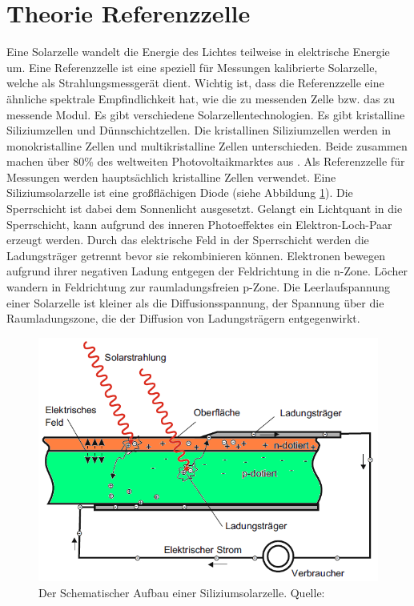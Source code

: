 \documentclass[a4paper,bibtotoc,oneside]{scrbook}
\begin{document}
\section{Theorie Referenzzelle}\thispagestyle{empty}
Eine Solarzelle wandelt die Energie des Lichtes teilweise in elektrische Energie um. Eine Referenzzelle ist eine speziell für Messungen kalibrierte Solarzelle, welche als Strahlungsmessgerät dient. Wichtig ist, dass die Referenzzelle eine ähnliche spektrale Empfindlichkeit hat, wie die zu messenden Zelle bzw. das zu messende Modul.
Es gibt verschiedene Solarzellentechnologien. Es gibt kristalline Siliziumzellen und Dünnschichtzellen. Die kristallinen Siliziumzellen werden in monokristalline Zellen und multikristalline Zellen unterschieden. Beide zusammen machen über 80\% des weltweiten Photovoltaikmarktes aus \cite{iea00}. Als Referenzzelle für Messungen werden hauptsächlich kristalline Zellen verwendet. 
Eine Siliziumsolarzelle ist eine großflächigen Diode (siehe Abbildung \ref{cell}). Die Sperrschicht ist dabei dem Sonnenlicht ausgesetzt. Gelangt ein Lichtquant in die Sperrschicht, kann aufgrund des inneren Photoeffektes ein Elektron-Loch-Paar erzeugt werden. Durch das elektrische Feld in der Sperrschicht werden die Ladungsträger getrennt bevor sie rekombinieren können. Elektronen bewegen aufgrund ihrer negativen Ladung entgegen der Feldrichtung in die n-Zone. Löcher wandern in Feldrichtung zur raumladungsfreien p-Zone. Die Leerlaufspannung einer Solarzelle ist kleiner als die Diffusionsspannung, der Spannung über die Raumladungszone, die der Diffusion von Ladungsträgern entgegenwirkt.
\begin{figure}[htbp]
\centering
\includegraphics[width=125mm]{img/zelle2.png}
\caption{Der Schematischer Aufbau einer Siliziumsolarzelle. Quelle: \cite{pv}}\label{cell}
\end{figure}
\end{document}
